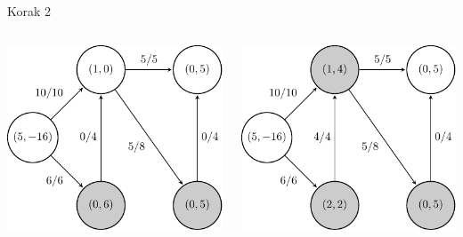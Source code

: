 \documentclass{beamer}
\begin{document}
\begin{frame}{Korak 2}
    \begin{columns}
        \begin{column}{0.5\textwidth}
            \centering
            \includegraphics[scale=0.7]{../writing/images/graf2-3.pdf}
        \end{column}
        \pause
        \begin{column}{0.5\textwidth}
            \centering
            \includegraphics[scale=0.7]{../writing/images/graf2-4.pdf}
        \end{column}
    \end{columns}
\end{frame}
\end{document}
